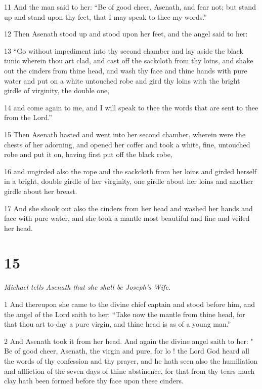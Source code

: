 \par 11 And the man said to her: “Be of good cheer, Asenath, and fear not; but stand up and stand upon thy feet, that I may speak to thee my words.” 

\par 12 Then Asenath stood up and stood upon her feet, and the angel said to her: 

\par 13 “Go without impediment into thy second chamber and lay aside the black tunic wherein thou art clad, and cast off the sackcloth from thy loins, and shake out the cinders from thine head, and wash thy face and thine hands with pure water and put on a white untouched robe and gird thy loins with the bright girdle of virginity, the double one, 

\par 14 and come again to me, and I will speak to thee the words that are sent to thee from the Lord.” 

\par 15 Then Asenath hasted and went into her second chamber, wherein were the chests of her adorning, and opened her coffer and took a white, fine, untouched robe and put it on, having first put off the black robe, 

\par 16 and ungirded also the rope and the sackcloth from her loins and girded herself in a bright, double girdle of her virginity, one girdle about her loins and another girdle about her breast. 

\par 17 And she shook out also the cinders from her head and washed her hands and face with pure water, and she took a mantle most beautiful and fine and veiled her head. 

\chapter{15}

\par \textit{Michael tells Asenath that she shall be Joseph's Wife.}

\par 1 And thereupon she came to the divine chief captain and stood before him, and the angel of the Lord saith to her: “Take now the mantle from thine head, for that thou art to-day a pure virgin, and thine head is as of a young man.” 

\par 2 And Asenath took it from her head. And again the divine angel saith to her: " Be of good cheer, Asenath, the virgin and pure, for lo ! the Lord God heard all the words of thy confession and thy prayer, and he hath seen also the humiliation and affliction of the seven days of thine abstinence, for that from thy tears much clay hath been formed before thy face upon these cinders. 

